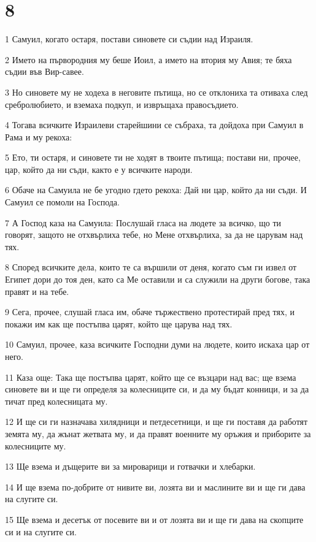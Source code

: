 \chapter{8}

\par 1 Самуил, когато остаря, постави синовете си съдии над Израиля.
\par 2 Името на първородния му беше Иоил, а името на втория му Авия; те бяха съдии във Вир-савее.
\par 3 Но синовете му не ходеха в неговите пътища, но се отклониха та отиваха след сребролюбието, и вземаха подкуп, и извръщаха правосъдието.
\par 4 Тогава всичките Израилеви старейшини се събраха, та дойдоха при Самуил в Рама и му рекоха:
\par 5 Ето, ти остаря, и синовете ти не ходят в твоите пътища; постави ни, прочее, цар, който да ни съди, както е у всичките народи.
\par 6 Обаче на Самуила не бе угодно гдето рекоха: Дай ни цар, който да ни съди. И Самуил се помоли на Господа.
\par 7 А Господ каза на Самуила: Послушай гласа на людете за всичко, що ти говорят, защото не отхвърлиха тебе, но Мене отхвърлиха, за да не царувам над тях.
\par 8 Според всичките дела, които те са вършили от деня, когато съм ги извел от Египет дори до тоя ден, като са Ме оставили и са служили на други богове, така правят и на тебе.
\par 9 Сега, прочее, слушай гласа им, обаче тържествено протестирай пред тях, и покажи им как ще постъпва царят, който ще царува над тях.
\par 10 Самуил, прочее, каза всичките Господни думи на людете, които искаха цар от него.
\par 11 Каза още: Така ще постъпва царят, който ще се възцари над вас; ще взема синовете ви и ще ги определя за колесниците си, и да му бъдат конници, и за да тичат пред колесницата му.
\par 12 И ще си ги назначава хилядници и петдесетници, и ще ги поставя да работят земята му, да жънат жетвата му, и да правят военните му оръжия и приборите за колесниците му.
\par 13 Ще взема и дъщерите ви за мироварици и готвачки и хлебарки.
\par 14 И ще взема по-добрите от нивите ви, лозята ви и маслините ви и ще ги дава на слугите си.
\par 15 Ще взема и десетък от посевите ви и от лозята ви и ще ги дава на скопците си и на слугите си.
